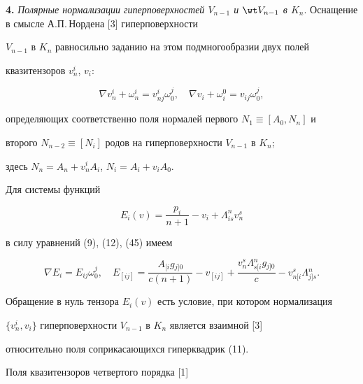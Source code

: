  


{\bf 4.} {\it Полярные нормализации гиперповерхностей $V_{n-1}$ и $\wt 


V_{n-1}$ в $K_n$}. Оснащение в смысле А.П.\,Нордена [3] гиперповерхности 


$V_{n-1}$ в $K_n$ равносильно заданию на этом подмногообразии двух полей 


квазитензоров $v^i_n$, $v_i$: 


\begin{equation} 


\nabla v^i_n+\omega^i_n=v^i_{nj}\omega^j_0,\quad 


\nabla v_i+\omega^0_i=v_{ij}\omega^j_0, 


\end{equation} 


определяющих соответственно поля нормалей первого $N_1\equiv[A_0,N_n]$ и 


второго $N_{n-2}\equiv[N_i]$ родов на гиперповерхности $V_{n-1}$ в $K_n$; 


здесь $N_n=A_n+v^i_n A_i$, $N_i=A_i+v_i A_0$. 


 


Для системы функций 


\begin{equation} 


E_i(v)=\frac{p_i}{n+1}-v_i+\Lambda^n_{is}v^s_n 


\end{equation} 


в силу уравнений (9), (12), (45) имеем 


$$ 


\nabla E_i=E_{ij}\omega^j_0,\quad E_{[ij]}= 


\frac{A{}_{[i}g{}_{j]0}}{c(n+1)}-v_{[ij]}+ 


\frac{v^s_n\Lambda{}^n_{s[i}g{}_{j]0}}{c}-v{}^s_{n[i}\Lambda{}^n_{j]s}. 


$$ 


 


Обращение в нуль тензора $E_i(v)$ есть условие, при котором нормализация 


$\{v^i_n,v_i\}$ гиперповерхности $V_{n-1}$ в $K_n$ является взаимной [3] 


относительно поля соприкасающихся гиперквадрик (11). 


 


Поля квазитензоров четвертого порядка [1]


